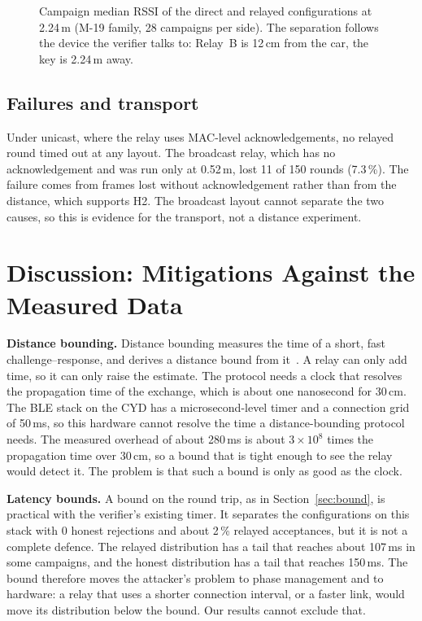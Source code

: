 \documentclass{ieeeaccess}
\begin{document}
\begin{figure}[t]
\centering

\caption{Campaign median RSSI of the direct and relayed configurations at 2.24\,m (M-19 family, 28 campaigns per side). The separation follows the device the verifier talks to: Relay~B is 12\,cm from the car, the key is 2.24\,m away.}
\label{fig:rssi}
\end{figure}

\subsection{Failures and transport}

Under unicast, where the relay uses MAC-level acknowledgements, no relayed round timed out at any layout. The broadcast relay, which has no acknowledgement and was run only at 0.52\,m, lost 11 of 150 rounds (7.3\,\%). The failure comes from frames lost without acknowledgement rather than from the distance, which supports H2. The broadcast layout cannot separate the two causes, so this is evidence for the transport, not a distance experiment.

\section{Discussion: Mitigations Against the Measured Data}
\label{sec:discussion}

\textbf{Distance bounding.} Distance bounding measures the time of a short, fast challenge--response, and derives a distance bound from it~\cite{b16,b27,b28}. A relay can only add time, so it can only raise the estimate. The protocol needs a clock that resolves the propagation time of the exchange, which is about one nanosecond for 30\,cm. The BLE stack on the CYD has a microsecond-level timer and a connection grid of 50\,ms, so this hardware cannot resolve the time a distance-bounding protocol needs. The measured overhead of about 280\,ms is about $3\times10^{8}$ times the propagation time over 30\,cm, so a bound that is tight enough to see the relay would detect it. The problem is that such a bound is only as good as the clock.

\textbf{Latency bounds.} A bound on the round trip, as in Section~\ref{sec:bound}, is practical with the verifier's existing timer. It separates the configurations on this stack with 0 honest rejections and about 2\,\% relayed acceptances, but it is not a complete defence. The relayed distribution has a tail that reaches about 107\,ms in some campaigns, and the honest distribution has a tail that reaches 150\,ms. The bound therefore moves the attacker's problem to phase management and to hardware: a relay that uses a shorter connection interval, or a faster link, would move its distribution below the bound. Our results cannot exclude that.
\end{document}
